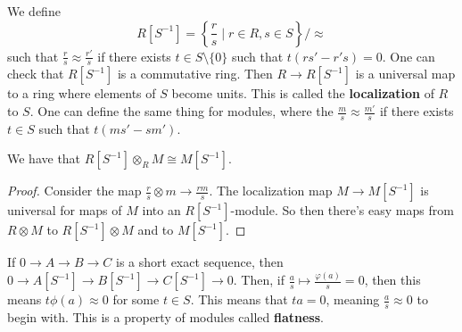 We define
\[ R[S^{-1}] = \left\{ \frac{r}{s} \mid r \in R, s \in S\right\}/\approx \]
such that $\frac{r}{s} \approx \frac{r'}{s}$ if there exists $t \in S\setminus\{0\}$ such that
$t(rs' - r's) = 0$. One can check that $R[S^{-1}]$ is a commutative ring.
Then $R \to R[S^{-1}]$ is a universal map to a ring where elements of $S$ become units.
This is called the \textbf{localization} of $R$ to $S$. One can define the same
thing for modules, where the $\frac{m}{s} \approx \frac{m'}{s}$ if there exists $t \in S$
such that $t(ms' - sm')$.
\begin{theorem}
    We have that $R[S^{-1}]\otimes_R M \cong M[S^{-1}]$.
    \begin{proof}
        Consider the map $\frac{r}{s} \otimes m \to \frac{rm}{s}$.
        The localization map $M \to M[S^{-1}]$ is universal for maps of $M$
        into an $R[S^{-1}]$-module. So then there's easy maps from $R \otimes M$ to $R[S^{-1}] \otimes M$
        and to $M[S^{-1}]$.
    \end{proof}
\end{theorem}
If $0 \to A \to B \to C$ is a short exact sequence,
then $0 \to A[S^{-1}] \to B[S^{-1}] \to C[S^{-1}] \to 0$.
Then, if $\frac{a}{s} \mapsto \frac{\varphi(a)}{s} = 0$, then this means $t \phi(a) \approx 0$
for some $t \in S$. This means that $ta = 0$, meaning $\frac{a}{s} \approx 0$ to begin with.
This is a property of modules called \textbf{flatness}.
